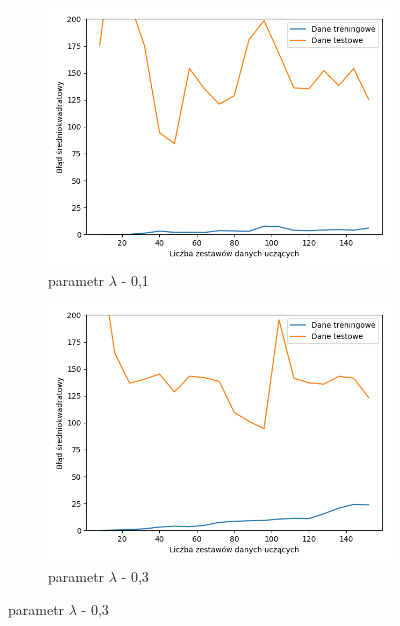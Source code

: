 \documentclass[12pt]{aghdpl}
\begin{document}
		 \begin{figure}[h]
		 	\begin{subfigure}{.5\linewidth}
		 		\includegraphics[width =\linewidth]{wykresy/6_regularyzacja/l2/regularyzacja_0_1_learning_curves.png}
		 		\caption{parametr $\lambda$ - 0,1}
		 	\end{subfigure}
		 	\begin{subfigure}{.5\linewidth}
		 		\includegraphics[width =\linewidth]{wykresy/6_regularyzacja/l2/regularyzacja_0_3_learning_curves.png}
		 		\caption{parametr $\lambda$ - 0,3}
		 	\end{subfigure}
		 	

\end{figure}
\end{document}
